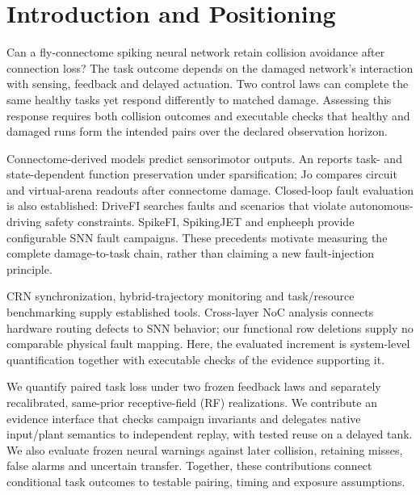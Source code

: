 \section{Introduction and Positioning}
Can a fly-connectome spiking neural network retain collision avoidance after connection loss? The task outcome depends on the damaged network's interaction with sensing, feedback and delayed actuation. Two control laws can complete the same healthy tasks yet respond differently to matched damage. Assessing this response requires both collision outcomes and executable checks that healthy and damaged runs form the intended pairs over the declared observation horizon.

Connectome-derived models predict sensorimotor outputs\cite{shiu2024drosophila}. An reports task- and state-dependent function preservation under sparsification\cite{an2026sparse}; Jo compares circuit and virtual-arena readouts after connectome damage\cite{jo2026simulating}. Closed-loop fault evaluation is also established: DriveFI searches faults and scenarios that violate autonomous-driving safety constraints\cite{jha2019drivefi}. SpikeFI, SpikingJET and enpheeph provide configurable SNN fault campaigns\cite{spyrou2024spikefi,gogebakan2024spikingjet,colucci2022enpheeph}. These precedents motivate measuring the complete damage-to-task chain, rather than claiming a new fault-injection principle.

CRN synchronization\cite{glasserman1992crn}, hybrid-trajectory monitoring\cite{donze2010breach} and task/resource benchmarking\cite{yik2023neurobench,dangelo2026embodied} supply established tools. Cross-layer NoC analysis connects hardware routing defects to SNN behavior\cite{chessa2026crosslayer}; our functional row deletions supply no comparable physical fault mapping. Here, the evaluated increment is system-level quantification together with executable checks of the evidence supporting it.

We quantify paired task loss under two frozen feedback laws and separately recalibrated, same-prior receptive-field (RF) realizations. We contribute an evidence interface that checks campaign invariants and delegates native input/plant semantics to independent replay, with tested reuse on a delayed tank. We also evaluate frozen neural warnings against later collision, retaining misses, false alarms and uncertain transfer. Together, these contributions connect conditional task outcomes to testable pairing, timing and exposure assumptions.
